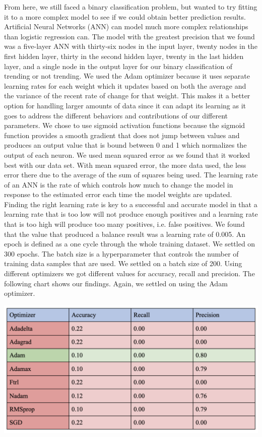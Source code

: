 \documentclass{article}
\begin{document}
\quad From here, we still faced a binary classification problem, but wanted to try fitting it to a more complex model to see if we could obtain better prediction results.  Artificial Neural Networks (ANN) can model much more complex relationships than logistic regression can.  The model with the greatest precision that we found was a five-layer ANN with thirty-six nodes in the input layer, twenty nodes in the first hidden layer, thirty in the second hidden layer, twenty in the last hidden layer, and a single node in the output layer for our binary classification of trending or not trending.  We used the Adam optimizer because it uses separate learning rates for each weight which it updates based on both the average and the variance of the recent rate of change for that weight.  This makes it a better option for handling larger amounts of data since it can adapt its learning as it goes to address the different behaviors and contributions of our different parameters.  We chose to use sigmoid activation functions because the sigmoid function provides a smooth gradient that does not jump between values and produces an output value that is bound between 0 and 1 which normalizes the output of each neuron. We used mean squared error as we found that it worked best with our data set. With mean squared error, the more data used, the less error there due to the average of the sum of squares being used. The learning rate of an ANN is the rate of which controls how much to change the model in response to the estimated error each time the model weights are updated. Finding the right learning rate is key to a successful and accurate model in that a learning rate that is too low will not produce enough positives and a learning rate that is too high will produce too many positives, i.e. false positives. We found that the value that produced a balance result was a learning rate of 0.005. An epoch is defined as a one cycle through the whole training dataset. We settled on 300 epochs. The batch size is a hyperparameter that controls the number of training data samples that are used. We settled on a batch size of 200.  Using different optimizers we got different values for accuracy, recall and precision. The following chart shows our findings. Again, we settled on using the Adam optimizer. 
\begin{center}
\includegraphics[scale=.55]{optimizer_results.png}\\
\end{center}
\end{document}

